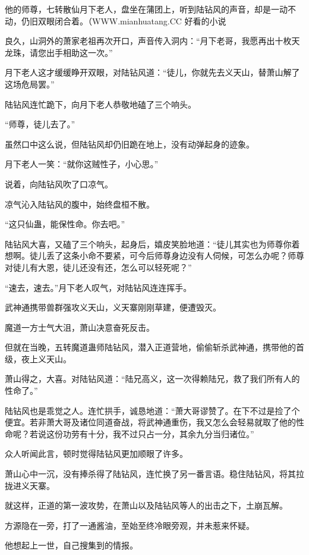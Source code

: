 
\begin{this_body}

他的师尊，七转散仙月下老人，盘坐在蒲团上，听到陆钻风的声音，却是一动不动，仍旧双眼闭合着。（WWW.mianhuatang.CC 好看的小说

良久，山洞外的萧家老祖再次开口，声音传入洞内：“月下老哥，我愿再出十枚天龙珠，请您出手相助这一次。”

月下老人这才缓缓睁开双眼，对陆钻风道：“徒儿，你就先去义天山，替萧山解了这场危局罢。”

陆钻风连忙跪下，向月下老人恭敬地磕了三个响头。

“师尊，徒儿去了。”

虽然口中这么说，但陆钻风却仍旧跪在地上，没有动弹起身的迹象。

月下老人一笑：“就你这贼性子，小心思。”

说着，向陆钻风吹了口凉气。

凉气沁入陆钻风的腹中，始终盘桓不散。

“这只仙蛊，能保性命。你去吧。”

陆钻风大喜，又磕了三个响头，起身后，嬉皮笑脸地道：“徒儿其实也为师尊你着想啊。徒儿丢了这条小命不要紧，可今后师尊身边没有人伺候，可怎么办呢？师尊对徒儿有大恩，徒儿还没有还，怎么可以轻死呢？”

“速去，速去。”月下老人叹气，对陆钻风连连挥手。

武神通携带兽群强攻义天山，义天寨刚刚草建，便遭毁灭。

魔道一方士气大沮，萧山决意奋死反击。

但就在当晚，五转魔道蛊师陆钻风，潜入正道营地，偷偷斩杀武神通，携带他的首级，夜上义天山。

萧山得之，大喜。对陆钻风道：“陆兄高义，这一次得赖陆兄，救了我们所有人的性命了。”

陆钻风也是乖觉之人。连忙拱手，诚恳地道：“萧大哥谬赞了。在下不过是捡了个便宜。若非萧大哥及诸位同道奋战，将武神通重伤，我又怎么会轻易就取了他的性命呢？若说这份功劳有十分，我不过只占一分，其余九分当归诸位。”

众人听闻此言，顿时觉得陆钻风更加顺眼了许多。

萧山心中一沉，没有捧杀得了陆钻风，连忙换了另一番言语。稳住陆钻风，将其拉拢进义天寨。

就这样，正道的第一波攻势，在萧山以及陆钻风等人的出击之下，土崩瓦解。

方源隐在一旁，打了一通酱油，至始至终冷眼旁观，并未惹来怀疑。

他想起上一世，自己搜集到的情报。


\end{this_body}
